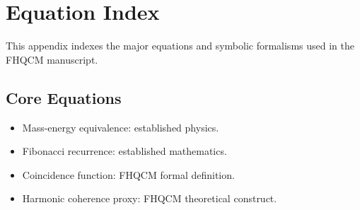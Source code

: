 \chapter{Equation Index}

This appendix indexes the major equations and symbolic formalisms used in the FHQCM manuscript.

\section{Core Equations}

\begin{itemize}
\item Mass-energy equivalence: established physics.
\item Fibonacci recurrence: established mathematics.
\item Coincidence function: FHQCM formal definition.
\item Harmonic coherence proxy: FHQCM theoretical construct.
\end{itemize}
